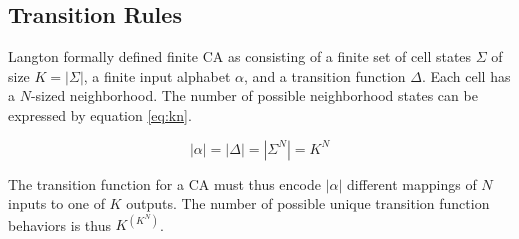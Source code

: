 %

%

\subsection{Transition Rules}
\label{sec:transitions}
Langton \cite{langton-1990} formally defined finite CA as consisting of a finite set of cell states $\Sigma$ of size $K = |\Sigma|$,
a finite input alphabet $\alpha$, and a transition function $\Delta$.
Each cell has a $N$-sized neighborhood.
The number of possible neighborhood states can be expressed by equation \eqref{eq:kn}.

\begin{equation}\label{eq:kn}
    |\alpha| = |\Delta| = |\Sigma^N| = K^N
\end{equation}

The transition function for a CA must thus encode $|\alpha|$ different mappings of $N$ inputs to one of $K$ outputs.
The number of possible unique transition function behaviors is thus $K^{(K^N)}$.

